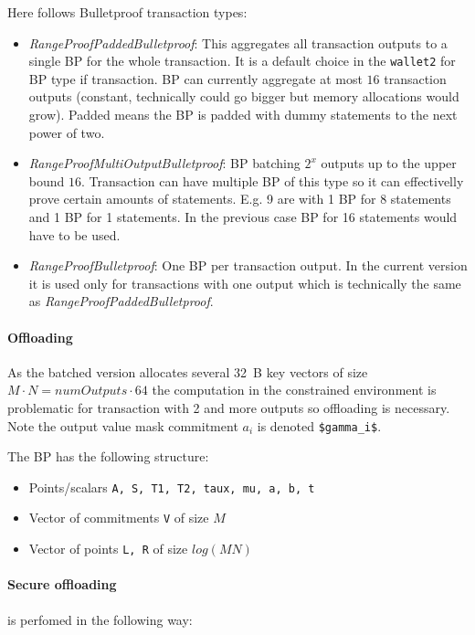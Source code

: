 \documentclass[]{article}
\begin{document}
Here follows Bulletproof transaction types:
\begin{itemize}
	\item {\it RangeProofPaddedBulletproof}: This aggregates all transaction outputs to a single BP for the whole transaction. It is a default choice in the \verb|wallet2| for BP type if transaction. BP can currently aggregate at most $16$ transaction outputs (constant, technically could go bigger but memory allocations would grow). Padded means the BP is padded with dummy statements to the next power of two.
	
	\item {\it RangeProofMultiOutputBulletproof}: BP batching $2^x$ outputs up to the upper bound $16$. Transaction can have multiple BP of this type so it can effectivelly prove certain amounts of statements. E.g. 9 are with 1 BP for 8 statements and 1 BP for 1 statements. In the previous case BP for 16 statements would have to be used.
	
	\item {\it RangeProofBulletproof}: One BP per transaction output. In the current version it is used only for transactions with one output which is technically the same as {\it RangeProofPaddedBulletproof}.
\end{itemize}

\paragraph{Offloading} As the batched version allocates several 32~B key vectors of size $M\cdot N  = numOutputs \cdot 64$ the computation in the constrained environment is problematic for transaction with 2 and more outputs so offloading is necessary. Note the output value mask commitment $a_i$ is denoted \verb|$gamma_i$|.

The BP has the following structure:
\begin{itemize}
	\item Points/scalars \verb|A, S, T1, T2, taux, mu, a, b, t|
	\item Vector of commitments \verb|V| of size $M$
	\item Vector of points \verb|L, R| of size $log(MN)$
\end{itemize}

\paragraph{Secure offloading} is perfomed in the following way:
\end{document}
